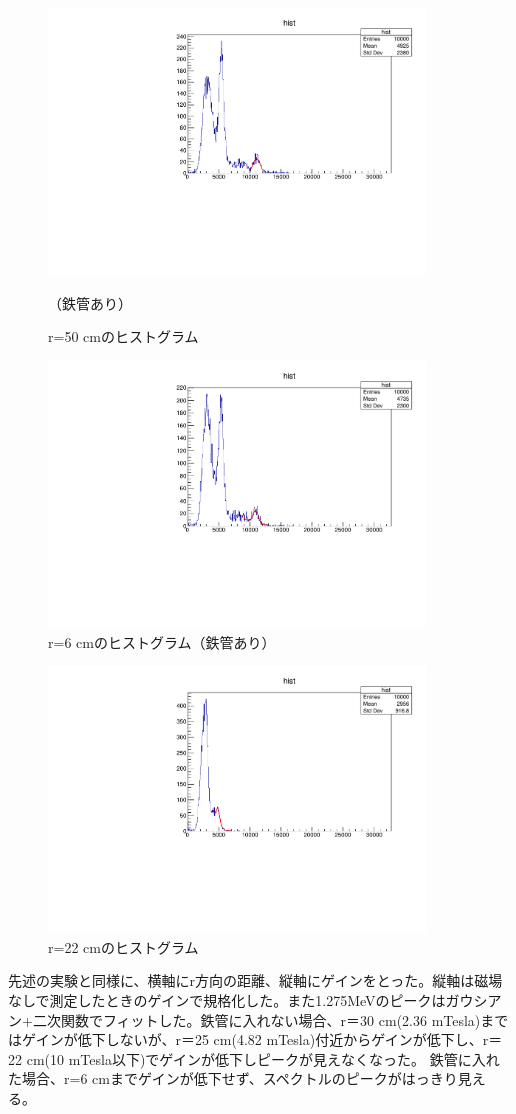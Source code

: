 \begin{figure}[H]
	\centering
		\includegraphics[angle=-90,width=10cm]{fig/iguchi/minicoin22.pdf}
	\caption{r=50 cmのヒストグラム}（鉄管あり）
	\label{histminicoin22}
\end{figure}

\begin{figure}[H]
	\centering
		\includegraphics[angle=-90,width=10cm]{fig/iguchi/minicoin21.pdf}
	\caption{r=6 cmのヒストグラム（鉄管あり）}
	\label{histminicoin21}
\end{figure}

\begin{figure}[H]
	\centering
		\includegraphics[angle=-90,width=10cm]{fig/iguchi/minicoout22.pdf}
	\caption{r=22 cmのヒストグラム}
	\label{histminicoout22}
\end{figure}
先述の実験と同様に、横軸にr方向の距離、縦軸にゲインをとった。縦軸は磁場なしで測定したときのゲインで規格化した。また1.275MeVのピークはガウシアン+二次関数でフィットした。鉄管に入れない場合、r＝30 cm(2.36 mTesla)まではゲインが低下しないが、r＝25 cm(4.82 mTesla)付近からゲインが低下し、r＝22 cm(10 mTesla以下)でゲインが低下しピークが見えなくなった。
鉄管に入れた場合、r=6 cmまでゲインが低下せず、スペクトルのピークがはっきり見える。


